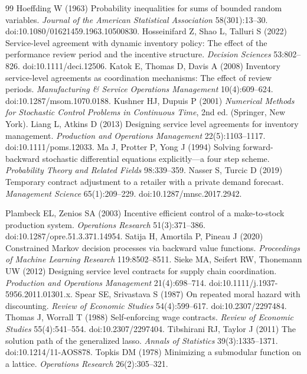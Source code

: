 \begin{thebibliography}{99}
Hoeffding W (1963) Probability inequalities for sums of bounded random variables. \emph{Journal of the American Statistical Association} 58(301):13--30. doi:10.1080/01621459.1963.10500830.
Hosseinifard Z, Shao L, Talluri S (2022) Service-level agreement with dynamic inventory policy: The effect of the performance review period and the incentive structure. \emph{Decision Sciences} 53:802--826. doi:10.1111/deci.12506.
Katok E, Thomas D, Davis A (2008) Inventory service-level agreements as coordination mechanisms: The effect of review periods. \emph{Manufacturing \& Service Operations Management} 10(4):609--624. doi:10.1287/msom.1070.0188.
Kushner HJ, Dupuis P (2001) \emph{Numerical Methods for Stochastic Control Problems in Continuous Time}, 2nd ed. (Springer, New York).
Liang L, Atkins D (2013) Designing service level agreements for inventory management. \emph{Production and Operations Management} 22(5):1103--1117. doi:10.1111/poms.12033.
Ma J, Protter P, Yong J (1994) Solving forward-backward stochastic differential equations explicitly---a four step scheme. \emph{Probability Theory and Related Fields} 98:339--359.
Nasser S, Turcic D (2019) Temporary contract adjustment to a retailer with a private demand forecast. \emph{Management Science} 65(1):209--229. doi:10.1287/mnsc.2017.2942.

Plambeck EL, Zenios SA (2003) Incentive efficient control of a make-to-stock production system. \emph{Operations Research} 51(3):371--386. doi:10.1287/opre.51.3.371.14954.
Satija H, Amortila P, Pineau J (2020) Constrained Markov decision processes via backward value functions. \emph{Proceedings of Machine Learning Research} 119:8502--8511.
Sieke MA, Seifert RW, Thonemann UW (2012) Designing service level contracts for supply chain coordination. \emph{Production and Operations Management} 21(4):698--714. doi:10.1111/j.1937-5956.2011.01301.x.
Spear SE, Srivastava S (1987) On repeated moral hazard with discounting. \emph{Review of Economic Studies} 54(4):599--617. doi:10.2307/2297484.
Thomas J, Worrall T (1988) Self-enforcing wage contracts. \emph{Review of Economic Studies} 55(4):541--554. doi:10.2307/2297404.
Tibshirani RJ, Taylor J (2011) The solution path of the generalized lasso. \emph{Annals of Statistics} 39(3):1335--1371. doi:10.1214/11-AOS878.
Topkis DM (1978) Minimizing a submodular function on a lattice. \emph{Operations Research} 26(2):305--321.



\end{thebibliography}
